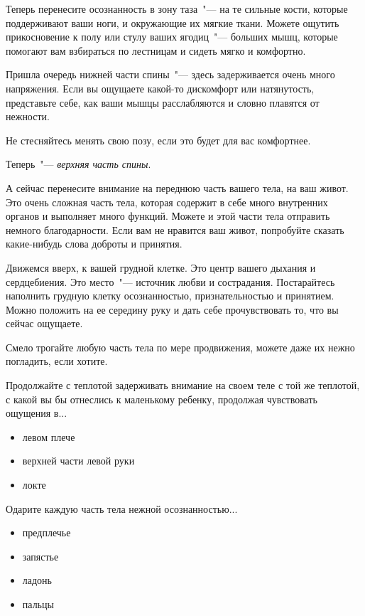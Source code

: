 \begin{itemize}
	\itemdiamondsuit Теперь перенесите осознанность в зону таза~"--- на те сильные кости, которые поддерживают ваши ноги, и окружающие их мягкие ткани. Можете ощутить прикосновение к полу или стулу ваших ягодиц~"--- больших мышц, которые помогают вам взбираться по лестницам и сидеть мягко и комфортно.
	
	\itemdiamondsuit Пришла очередь нижней части спины~"--- здесь задерживается очень много напряжения. Если вы ощущаете какой-то дискомфорт или натянутость, представьте себе, как ваши мышцы расслабляются и словно плавятся от нежности.
	
	\itemdiamondsuit Не стесняйтесь менять свою позу, если это будет для вас комфортнее.
	
	\itemdiamondsuit Теперь~"--- \emph{верхняя часть спины}.
	
	\itemdiamondsuit А сейчас перенесите внимание на переднюю часть вашего тела, на ваш живот. Это очень сложная часть тела, которая содержит в себе много внутренних органов и выполняет много функций. Можете и этой части тела отправить немного благодарности. Если вам не нравится ваш живот, попробуйте сказать какие-нибудь слова доброты и принятия.
	
	\itemdiamondsuit Движемся вверх, к вашей грудной клетке. Это центр вашего дыхания и сердцебиения. Это место~"--- источник любви и сострадания. Постарайтесь наполнить грудную клетку осознанностью, признательностью и принятием. Можно положить на ее середину руку и дать себе прочувствовать то, что вы сейчас ощущаете.
	
	\itemdiamondsuit Смело трогайте любую часть тела по мере продвижения, можете даже их нежно погладить, если хотите.
	
	\itemdiamondsuit Продолжайте с теплотой задерживать внимание на своем теле с той же теплотой, с какой вы бы отнеслись к маленькому ребенку, продолжая чувствовать ощущения в...
	\begin{itemize}
		\item левом плече
		\item верхней части левой руки
		\item локте
	\end{itemize}
	
	\itemdiamondsuit Одарите каждую часть тела нежной осознанностью...
	\begin{itemize}
		\item предплечье
		\item запястье
		\item ладонь
		\item пальцы	
	\end{itemize}
	

\end{itemize}

